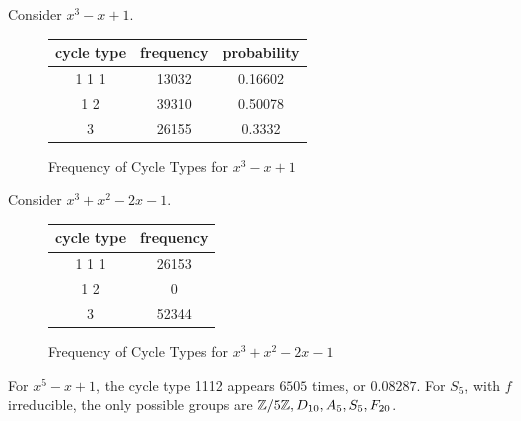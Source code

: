 \documentclass[10pt, twoside]{article}
\begin{document}
        \begin{exm}
            Consider $x^3-x+1$.
            \begin{figure}[H]
                \begin{center}
                    \begin{tabular}{ccc}
                        \toprule
                        cycle type & frequency & probability \\
                        \midrule
                        1 1 1 & 13032 & 0.16602 \\
                        1 2 & 39310 & 0.50078 \\
                        3 & 26155 & 0.3332 \\
                        \bottomrule
                    \end{tabular}
                \end{center}
                \caption{Frequency of Cycle Types for $x^3-x+1$}%
                \label{fig:frequency-cycle-types}
            \end{figure}
        \end{exm}
        \begin{exm}
            Consider $x^3+x^2 -2x-1$.
            \begin{figure}[H]
                \begin{center}
                    \begin{tabular}{cc}
                        \toprule
                        cycle type & frequency  \\
                        \midrule
                        1 1 1 & 26153  \\
                        1 2 & 0  \\
                        3 & 52344  \\
                        \bottomrule
                    \end{tabular}
                \end{center}
                \caption{Frequency of Cycle Types for $x^3+x^2-2x-1$}%
                \label{fig:frequency-cycle-types-2}
            \end{figure}
        \end{exm}

        \begin{exm}
            For $x^5-x+1$, the cycle type 1112 appears $6505$ times, or $0.08287$. For $S_5$, with $f$ irreducible, the only possible groups are $\mathbb{Z}/5\mathbb{Z}, D_{10}, A_5, S_5, F_{20}$.
        \end{exm}
\end{document}
